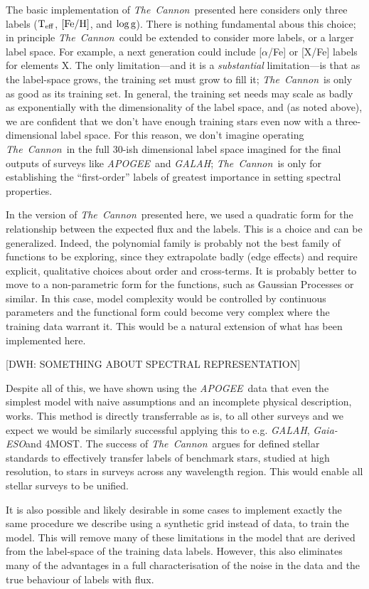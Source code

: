 \documentclass[12pt, preprint]{aastex}
\newcommand{\teff}{\mbox{$\rm T_{eff}$}}
\newcommand{\feh}{\mbox{$\rm [Fe/H]$}}
\newcommand{\logg}{\mbox{$\rm \log g$}}
\newcommand{\tc}{\textsl{The~Cannon}}
\newcommand{\apogee}{\textsl{APOGEE}}
\newcommand{\galah}{\textsl{GALAH}}
\newcommand{\gaiaeso}{\textsl{Gaia-ESO}}
\begin{document}
The basic implementation of \tc\ presented here considers only three
labels (\teff, \feh, and \logg).
There is nothing fundamental abous this choice; in principle
\tc\ could be extended to consider more labels, or a larger
label space.
For example, a next generation could include [$\alpha$/Fe] or [X/Fe]
labels for elements X.
The only limitation---and it is a \emph{substantial} limitation---is
that as the label-space grows, the training set must grow to fill it;
\tc\ is only as good as its training set.
In general, the training set needs may scale as badly as exponentially
with the dimensionality of the label space, and (as noted above), we
are confident that we don't have enough training stars even now with
a three-dimensional label space.
For this reason, we don't imagine operating \tc\ in the full 30-ish
dimensional label space imagined for the final outputs of surveys like
\apogee\ and \galah; \tc\ is only for establishing the ``first-order'' labels of
greatest importance in setting spectral properties.

In the version of \tc\ presented here, we used a quadratic form for the
relationship between the expected flux and the labels.
This is a choice and can be generalized.
Indeed, the polynomial family is probably not the best family of
functions to be exploring, since they extrapolate badly (edge effects)
and require explicit, qualitative choices about order and cross-terms.
It is probably better to move to a non-parametric form for the functions,
such as Gaussian Processes or similar.
In this case, model complexity would be controlled by continuous
parameters and the functional form could become very complex where the
training data warrant it.
This would be a natural extension of what has been implemented here.

[DWH: SOMETHING ABOUT SPECTRAL REPRESENTATION]

Despite all of this, we have shown using the \apogee\ data that even the simplest model with naive assumptions and an incomplete physical description, works. This method is directly transferrable as is, to all other surveys and we expect we would be similarly successful applying this to e.g. \textit{GALAH}, \gaiaeso and 4MOST. The success of \tc\ argues for defined stellar standards to effectively transfer labels of benchmark stars, studied at high resolution, to stars in surveys across any wavelength region. This would enable all stellar surveys to be unified. 
 
 It is also possible and likely desirable in some cases to implement exactly the same procedure we describe using a synthetic grid instead of data, to train the model. This will remove many of these limitations in the model that are derived from the label-space of the training data labels. However, this also eliminates many of the advantages in a full characterisation of the noise in the data and the true behaviour of labels with flux.%
 
\end{document}
